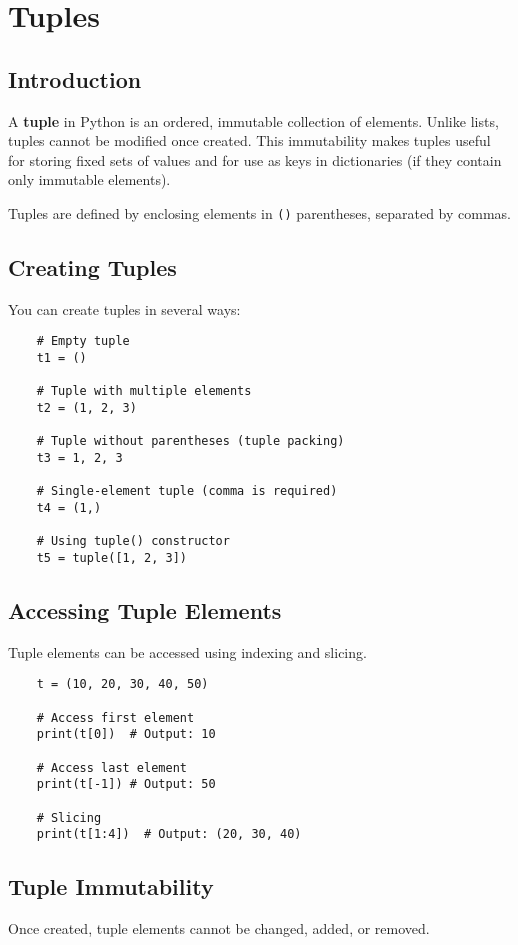 \chapter{Tuples}

\section{Introduction}
A \textbf{tuple} in Python is an ordered, immutable collection of elements. Unlike lists, tuples cannot be modified once created. This immutability makes tuples useful for storing fixed sets of values and for use as keys in dictionaries (if they contain only immutable elements).

Tuples are defined by enclosing elements in \texttt{()} parentheses, separated by commas.

\section{Creating Tuples}
You can create tuples in several ways:

\begin{verbatim}
	# Empty tuple
	t1 = ()
	
	# Tuple with multiple elements
	t2 = (1, 2, 3)
	
	# Tuple without parentheses (tuple packing)
	t3 = 1, 2, 3
	
	# Single-element tuple (comma is required)
	t4 = (1,)
	
	# Using tuple() constructor
	t5 = tuple([1, 2, 3])
\end{verbatim}

\section{Accessing Tuple Elements}
Tuple elements can be accessed using indexing and slicing.

\begin{verbatim}
	t = (10, 20, 30, 40, 50)
	
	# Access first element
	print(t[0])  # Output: 10
	
	# Access last element
	print(t[-1]) # Output: 50
	
	# Slicing
	print(t[1:4])  # Output: (20, 30, 40)
\end{verbatim}

\section{Tuple Immutability}
Once created, tuple elements cannot be changed, added, or removed.

